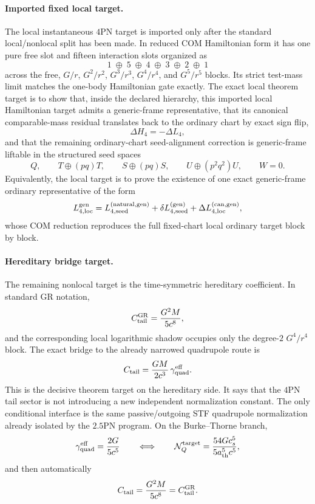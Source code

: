 \documentclass[11pt]{article}
\begin{document}
\paragraph{Imported fixed local target.}
The local instantaneous $4$PN target is imported only after the standard
local/nonlocal split has been made.  In reduced COM Hamiltonian form it has one
pure free slot and fifteen interaction slots organized as
\[
1\;\oplus\;5\;\oplus\;4\;\oplus\;3\;\oplus\;2\;\oplus\;1
\]
across the free, $G/r$, $G^2/r^2$, $G^3/r^3$, $G^4/r^4$, and $G^5/r^5$ blocks.
Its strict test-mass limit matches the one-body Hamiltonian gate exactly.
The exact local theorem target is to show that, inside the declared hierarchy,
this imported local Hamiltonian target admits a generic-frame representative,
that its canonical comparable-mass residual translates back to the ordinary
chart by exact sign flip,
\[
\Delta H_4=-\Delta L_4,
\]
and that the remaining ordinary-chart seed-alignment correction is generic-frame
liftable in the structured seed spaces
\[
Q,
\qquad
T\oplus(pq)T,
\qquad
S\oplus(pq)S,
\qquad
U\oplus(p^2q^2)U,
\qquad
W=0.
\]
Equivalently, the local target is to prove the existence of one exact
generic-frame ordinary representative of the form
\[
L_{4,\rm loc}^{\rm gen}
=
L_{4,\rm seed}^{(\rm natural,gen)}
+
\delta L_{4,\rm seed}^{(\rm gen)}
+
\Delta L_{4,\rm loc}^{(\rm can,gen)},
\]
whose COM reduction reproduces the full fixed-chart local ordinary target block
by block.

\paragraph{Hereditary bridge target.}
The remaining nonlocal target is the time-symmetric hereditary coefficient.
In standard GR notation,
\[
C_{\rm tail}^{\rm GR}=\frac{G^2M}{5c^8},
\]
and the corresponding local logarithmic shadow occupies only the degree-$2$
$G^4/r^4$ block.  The exact bridge to the already narrowed quadrupole route is
\[
C_{\rm tail}=\frac{GM}{2c^3}\,\gamma_{\rm quad}^{\rm eff}.
\]
This is the decisive theorem target on the hereditary side.  It says that the
$4$PN tail sector is not introducing a new independent normalization constant.
The only conditional interface is the same passive/outgoing STF quadrupole
normalization already isolated by the $2.5$PN program.  On the Burke--Thorne
branch,
\[
\gamma_{\rm quad}^{\rm eff}=\frac{2G}{5c^5}
\qquad\Longleftrightarrow\qquad
\mathcal N_Q^{\rm target}=\frac{54Gc_s^5}{5a_{\rm th}^5c^5},
\]
and then automatically
\[
C_{\rm tail}=\frac{G^2M}{5c^8}=C_{\rm tail}^{\rm GR}.
\]
\end{document}
